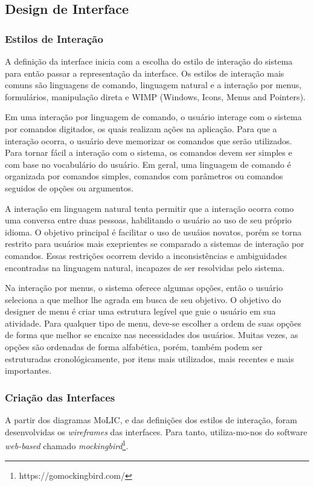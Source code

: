 	\subsection{Design de Interface}
	
		\subsubsection{Estilos de Interação}
A definição da interface inicia com a escolha do estilo de interação do sistema
para então passar a representação da interface.	Os estilos de interação mais
comuns são linguagens de comando, linguagem natural e a interação por menus,
formulários, manipulação direta e WIMP (Windows, Icons, Menus and Pointers).


	Em uma interação por linguagem de comando, o usuário interage com o sistema
por comandos digitados, os quais realizam ações na aplicação. Para que a
interação ocorra, o usuário deve memorizar os comandos que serão utilizados.
Para tornar fácil a interação com o sistema, os comandos devem ser simples e com
base no vocabulário do usuário. Em geral, uma linguagem de comando é organizada
por comandos simples, comandos com parâmetros ou comandos seguidos de opções ou
argumentos.


	A interação em linguagem natural tenta permitir que a interação ocorra como
uma conversa entre duas pessoas, habilitando o usuário ao uso de seu próprio
idioma. O objetivo principal é facilitar o uso de usuáios novatos, porém se
torna restrito para usuários mais exeprientes se comparado a sistemas de
interação por comandos. Essas restrições ocorrem devido a inconsistências e
ambiguidades encontradas na linguagem natural, incapazes de ser resolvidas pelo
sistema.


	Na interação por menus, o sistema oferece algumas opções, então o usuário
seleciona a que melhor lhe agrada em busca de seu objetivo. O objetivo do
designer de menu é criar uma estrutura legível que guie o usuário em sua
atividade. Para qualquer tipo de menu, deve-se escolher a ordem de suas opções
de forma que melhor se encaixe nas necessidades dos usuários. Muitas vezes, as
opções são ordenadas de forma alfabética, porém, também podem ser estruturadas
cronológicamente, por itens mais utilizados, mais recentes e mais importantes.
	
		
		\subsubsection{Criação das Interfaces}
			A partir dos diagramas MoLIC, e das definições dos estilos de interação, 
			foram desenvolvidas os \emph{wireframes} das interfaces. Para tanto, utiliza-mo-nos
			do software \emph{web-based} chamado \emph{mockingbird}\footnote{https://gomockingbird.com/}.
			
